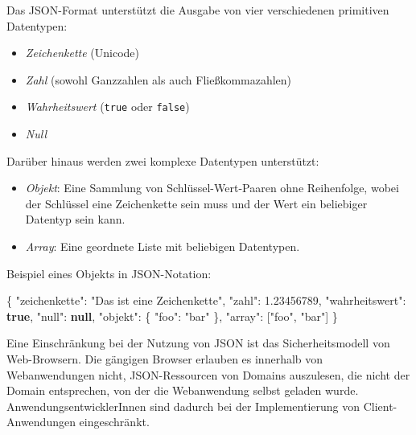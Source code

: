 \documentclass[,a4paper]{article}
\newenvironment{Shaded}{}{}
\newcommand{\KeywordTok}[1]{\textcolor[rgb]{0.00,0.44,0.13}{\textbf{{#1}}}}
\newcommand{\DataTypeTok}[1]{\textcolor[rgb]{0.56,0.13,0.00}{{#1}}}
\newcommand{\FloatTok}[1]{\textcolor[rgb]{0.25,0.63,0.44}{{#1}}}
\newcommand{\StringTok}[1]{\textcolor[rgb]{0.25,0.44,0.63}{{#1}}}
\newcommand{\OtherTok}[1]{\textcolor[rgb]{0.00,0.44,0.13}{{#1}}}
\newcommand{\FunctionTok}[1]{\textcolor[rgb]{0.02,0.16,0.49}{{#1}}}
\begin{document}
Das JSON-Format unterstützt die Ausgabe von vier verschiedenen
primitiven Datentypen:

\begin{itemize}
\itemsep1pt\parskip0pt
\item
  \emph{Zeichenkette} (Unicode)
\item
  \emph{Zahl} (sowohl Ganzzahlen als auch Fließkommazahlen)
\item
  \emph{Wahrheitswert} (\texttt{true} oder \texttt{false})
\item
  \emph{Null}
\end{itemize}

Darüber hinaus werden zwei komplexe Datentypen unterstützt:

\begin{itemize}
\itemsep1pt\parskip0pt
\item
  \emph{Objekt}: Eine Sammlung von Schlüssel-Wert-Paaren ohne
  Reihenfolge, wobei der Schlüssel eine Zeichenkette sein muss und der
  Wert ein beliebiger Datentyp sein kann.
\item
  \emph{Array}: Eine geordnete Liste mit beliebigen Datentypen.
\end{itemize}

Beispiel eines Objekts in JSON-Notation:

\begin{Shaded}
\begin{Highlighting}[]
\FunctionTok{\{}
    \DataTypeTok{"zeichenkette"}\FunctionTok{:} \StringTok{"Das ist eine Zeichenkette"}\FunctionTok{,}
    \DataTypeTok{"zahl"}\FunctionTok{:} \FloatTok{1.23456789}\FunctionTok{,}
    \DataTypeTok{"wahrheitswert"}\FunctionTok{:} \KeywordTok{true}\FunctionTok{,}
    \DataTypeTok{"null"}\FunctionTok{:} \KeywordTok{null}\FunctionTok{,}
    \DataTypeTok{"objekt"}\FunctionTok{:} \FunctionTok{\{}
        \DataTypeTok{"foo"}\FunctionTok{:} \StringTok{"bar"}
    \FunctionTok{\},}
    \DataTypeTok{"array"}\FunctionTok{:} \OtherTok{[}\StringTok{"foo"}\OtherTok{,} \StringTok{"bar"}\OtherTok{]}
\FunctionTok{\}}
\end{Highlighting}
\end{Shaded}


Eine Einschränkung bei der Nutzung von JSON ist das Sicherheitsmodell
von Web-Browsern. Die gängigen Browser erlauben es innerhalb von
Webanwendungen nicht, JSON-Ressourcen von Domains auszulesen, die nicht
der Domain entsprechen, von der die Webanwendung selbst geladen wurde.
AnwendungsentwicklerInnen sind dadurch bei der Implementierung von
Client-Anwendungen eingeschränkt.
\end{document}
